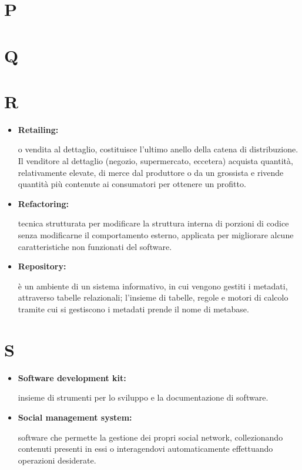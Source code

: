 \section*{P}

\section*{Q}

\section*{R}

\begin{itemize}
	\item \hypertarget{ret}{\textbf{Retailing:}} o vendita al dettaglio, costituisce l'ultimo anello della catena di distribuzione. Il venditore al dettaglio (negozio, supermercato, eccetera) acquista quantità, relativamente elevate, di merce dal produttore o da un grossista e rivende quantità più contenute ai consumatori per ottenere un profitto.
\end{itemize}

\begin{itemize}
	\item \hypertarget{ref}{\textbf{Refactoring:}} tecnica strutturata per modificare la struttura interna di porzioni di codice senza modificarne il comportamento esterno, applicata per migliorare alcune caratteristiche non funzionati del software.
	
	\item \hypertarget{rep}{\textbf{Repository:}} è un ambiente di un sistema informativo, in cui vengono gestiti i metadati, attraverso tabelle relazionali; l'insieme di tabelle, regole e motori di calcolo tramite cui si gestiscono i metadati prende il nome di metabase.
	
\end{itemize}

\section*{S}

\begin{itemize}
	\item \hypertarget{sdk}{\textbf{Software development kit:}}  insieme di strumenti per lo sviluppo e la documentazione di software.
	
	\item \hypertarget{sms}{\textbf{Social management system:}} software che permette la gestione dei propri social network, collezionando contenuti presenti in essi o interagendovi automaticamente effettuando operazioni desiderate.
\end{itemize}

